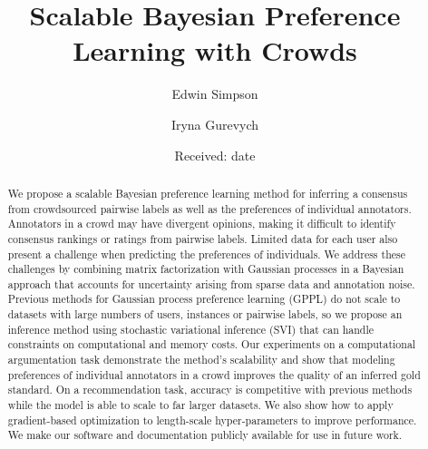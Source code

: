 \documentclass[smallextended,natbib]{svjour3}       %
\title{ 
Scalable Bayesian Preference Learning with Crowds
}
\author{Edwin Simpson 
\and Iryna Gurevych \\
}
\institute{Ubiquitous Knowledge Processing Lab, Dept. of Computer Science, Technische Universit\"at Darmstadt, Germany\\
              \email{\{simpson,gurevych\}@ukp.informatik.tu-darmstadt.de}
}
\date{Received: date}
\begin{document}

\maketitle

\begin{abstract}
We propose a scalable Bayesian preference learning method 
for inferring a consensus from crowdsourced pairwise labels 
as well as the preferences of individual annotators.
Annotators in a crowd may have divergent opinions, making it difficult to identify consensus rankings or ratings from
pairwise labels. Limited data for each user also present a challenge when predicting the preferences of individuals. 
We address these challenges by combining matrix factorization with 
Gaussian processes in a Bayesian approach that
accounts for uncertainty arising from sparse data and annotation noise.
Previous methods for Gaussian process preference learning (GPPL) do not scale to datasets with large numbers
 of users, instances or pairwise labels, so we propose an inference method using stochastic variational inference (SVI)
that can handle constraints on computational and memory costs.
Our experiments on a computational argumentation task
demonstrate the method's scalability and
 show that modeling preferences of individual annotators in a crowd improves the quality of
an inferred gold standard.
On a recommendation task, accuracy is competitive with previous methods
 while the model is able to scale to far larger datasets.
We also show how to  %
apply gradient-based optimization to length-scale hyper-parameters to improve performance.
We make our software and documentation publicly available for use in future work.

\end{abstract}
\end{document}
